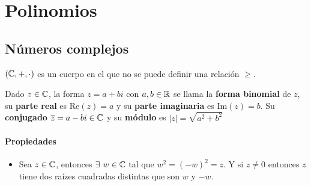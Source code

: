 \section{Polinomios}
\subsection{Números complejos}
$(\mathbb{C},+,\cdot)$ es un cuerpo en el que no se puede definir una relación $\geq$.

Dado $z\in\mathbb{C}$, la forma $z = a + bi$ con $a,b\in\mathbb{R}$ se llama la\textbf{ forma binomial} de $z$, su \textbf{parte real} es $\text{Re}(z)=a$ y su \textbf{parte imaginaria} es $\text{Im}(z)=b$. Su \textbf{conjugado} $\overline{z} = a - bi \in\mathbb{C}$ y su \textbf{m\'odulo} es $|z|=\sqrt{a^2+b^2}$

\paragraph{Propiedades}
\begin{itemize}
\item Sea $z\in\mathbb{C}$, entonces $\exists~w\in\mathbb{C}$ tal que $w^2 = (-w)^2 = z$. Y si $z\neq 0$ entonces $z$ tiene dos ra\'izes cuadradas distintas que son $w$ y $-w$.
\end{itemize}

